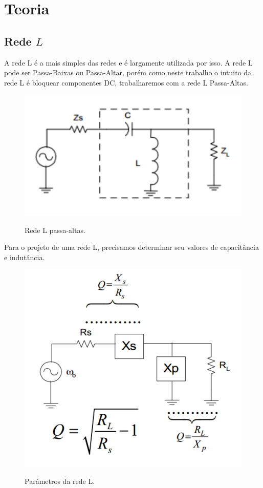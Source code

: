 \newpage
\section{Teoria}
\subsection{Rede $L$}
A rede L é a mais simples das redes e é largamente utilizada por isso. A rede L pode ser Passa-Baixas ou Passa-Altar, porém como neste trabalho o intuito da rede L é bloquear componentes DC, trabalharemos com a rede L Passa-Altas.

\begin{figure}[H]
    \centering
    \caption{Rede L passa-altas.}
    \includegraphics[scale=0.3]{Imagens/fig1.png}
    \label{f_fig1}
\end{figure}

Para o projeto de uma rede L, precisamos determinar seu valores de capacitância e indutância.

\begin{figure}[H]
    \centering
    \caption{Parâmetros da rede L.}
    \includegraphics[scale=0.3]{Imagens/fig2.png}
    \label{f_fig2}
\end{figure}

